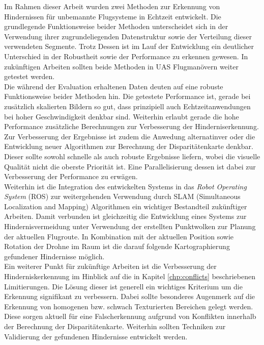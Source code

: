 Im Rahmen dieser Arbeit wurden zwei Methoden zur Erkennung von Hindernissen für unbemannte Flugsysteme in Echtzeit entwickelt. Die grundlegende Funktionsweise beider Methoden unterscheidet sich in der Verwendung ihrer zugrundeliegenden Datenstruktur sowie der Verteilung dieser verwendeten Segmente. Trotz Dessen ist im Lauf der Entwicklung ein deutlicher Unterschied in der Robustheit sowie der Performance zu erkennen gewesen. In zukünftigen Arbeiten sollten beide Methoden in UAS Flugmanövern weiter getestet werden.\\

\noindent
Die während der Evaluation erhaltenen Daten deuten auf eine robuste Funktionsweise beider Methoden hin. Die getestete Performance ist, gerade bei zusätzlich skalierten Bildern so gut, dass prinzipiell auch Echtzeitanwendungen bei hoher Geschwindigkeit denkbar sind. Weiterhin erlaubt gerade die hohe Performance zusätzliche Berechnungen zur Verbesserung der Hinderniserkennung.\\

\noindent
Zur Verbesserung der Ergebnisse ist zudem die Anwedung alternatinver oder die Entwicklung neuer Algorithmen zur Berechnung der Disparitätenkarte denkbar. Dieser sollte sowohl schnelle als auch robuste Ergebnisse liefern, wobei die visuelle Qualität nicht die oberste Priorität ist. Eine Parallelisierung dessen ist dabei zur Verbesserung der Performance zu erwägen.\\

\noindent
Weiterhin ist die Integration des entwickelten Systems in das \emph{Robot Operating System} (ROS) zur weitergehenden Verwendung durch SLAM (Simultaneous Localization and Mapping) Algorithmen ein wichtiger Bestandteil zukünftiger Arbeiten. Damit verbunden ist gleichzeitig die Entwicklung eines Systems zur Hindernisvermeidung unter Verwendung der erstellten Punktwolken zur Planung der aktuellen Flugroute. In Kombination mit der aktuellen Position sowie Rotation der Drohne im Raum ist die darauf folgende Kartographierung gefundener Hindernisse möglich.\\

\noindent
Ein weiterer Punkt für zukünftige Arbeiten ist die Verbesserung der Hinderniskerkennung im Hinblick auf die in Kapitel \ref{chp:conflicts} beschriebenen Limitierungen. Die Lösung dieser ist generell ein wichtiges Kriterium um die Erkennung signifikant zu verbessern. Dabei sollte besonderes Augenmerk auf die Erkennung von homogenen bzw. schwach Texturierten Bereichen gelegt werden. Diese sorgen aktuell für eine Falscherkennung aufgrund von Konflikten innerhalb der Berechnung der Disparitätenkarte. Weiterhin sollten Techniken zur Validierung der gefundenen Hindernisse entwickelt werden.